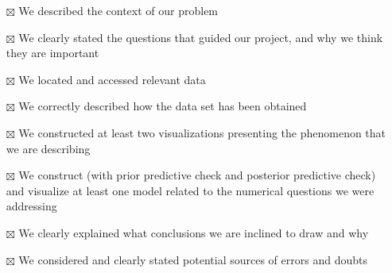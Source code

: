 \documentclass[
  10pt,
  dvipsnames,enabledeprecatedfontcommands]{scrartcl}
\providecommand{\tightlist}{%
  \setlength{\itemsep}{0pt}\setlength{\parskip}{0pt}}
\begin{document}
\begin{itemize}
\tightlist
\item[$\boxtimes$]
  We described the context of our problem
\item[$\boxtimes$]
  We clearly stated the questions that guided our project, and why we
  think they are important
\item[$\boxtimes$]
  We located and accessed relevant data
\item[$\boxtimes$]
  We correctly described how the data set has been obtained
\item[$\boxtimes$]
  We constructed at least two visualizations presenting the phenomenon
  that we are describing
\item[$\boxtimes$]
  We construct (with prior predictive check and posterior predictive
  check) and visualize at least one model related to the numerical
  questions we were addressing
\item[$\boxtimes$]
  We clearly explained what conclusions we are inclined to draw and why
\item[$\boxtimes$]
  We considered and clearly stated potential sources of errors and
  doubts
\end{itemize}
\end{document}

